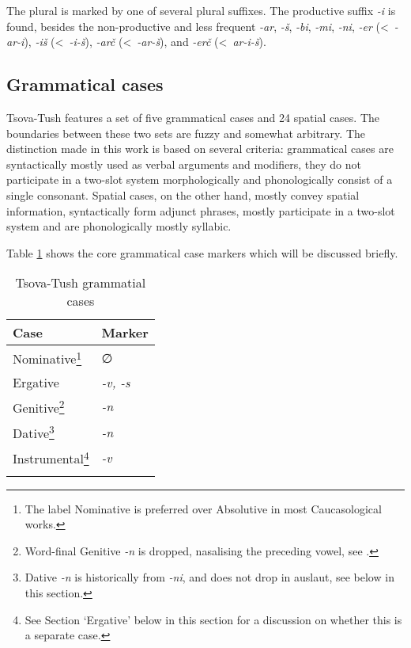 The plural is marked by one of several plural suffixes. The productive suffix \textit{-i} is found, besides the non-productive and less frequent \textit{-ar}, \textit{-š}, \textit{-bi}, \textit{-mi}, \textit{-ni}, \textit{-er} (<~\textit{-ar-i}), \textit{-iš} (<~\textit{-i-š}), \textit{-arč} (<~\textit{-ar-š}), and \textit{-erč} (<~\textit{ar-i-š}).

\subsection{Grammatical cases} \label{corecase}

Tsova-Tush features a set of five grammatical cases and 24 spatial cases. The boundaries between  these two sets are fuzzy and somewhat arbitrary. The distinction made in this work is based on several criteria: grammatical cases are syntactically mostly used as verbal arguments and modifiers, they do not participate in a two-slot system morphologically and phonologically consist of a single consonant. Spatial cases, on the other hand, mostly convey spatial information, syntactically form adjunct phrases, mostly participate in a two-slot system and are phonologically mostly syllabic.

Table \ref{table-corecase} shows the core grammatical case markers which will be discussed briefly.

\begin{table}[h]
	\begin{tabular}{ll}
		\lsptoprule
		Case & Marker\\
		\midrule
		Nominative\footnote{The label Nominative is preferred over Absolutive in most Caucasological works.} & ∅  \\
		Ergative & \textit{-v, -s}  \\
		Genitive\footnote{Word-final Genitive \textit{-n} is dropped, nasalising the preceding vowel, see \sectref{processes}.} & \textit{-n}    \\
		Dative\footnote{Dative \textit{-n} is historically from \textit{-ni}, and does not drop in auslaut, see below in this section.} & \textit{-n}    \\
		Instrumental\footnote{See Section `Ergative' below in this section for a discussion on whether this is a separate case.} & \textit{-v}    \\
		\lspbottomrule
	\end{tabular}
	\caption{Tsova-Tush grammatial cases}
	\label{table-corecase}
\end{table}

